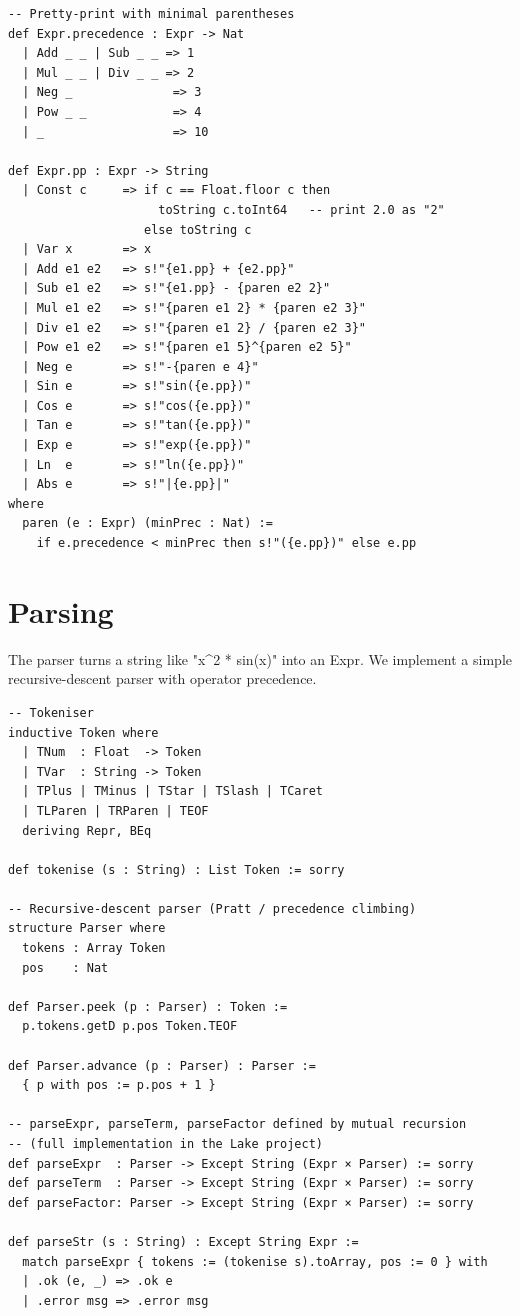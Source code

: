 \documentclass[12pt, openany]{book}
\theoremstyle{plain}
\theoremstyle{definition}
\theoremstyle{remark}
\newcommand{\li}[1]{{\ttfamily\small\color{tealaccent}#1}}
\begin{document}
\begin{leanbox}
\begin{lstlisting}
-- Pretty-print with minimal parentheses
def Expr.precedence : Expr -> Nat
  | Add _ _ | Sub _ _ => 1
  | Mul _ _ | Div _ _ => 2
  | Neg _              => 3
  | Pow _ _            => 4
  | _                  => 10

def Expr.pp : Expr -> String
  | Const c     => if c == Float.floor c then
                     toString c.toInt64   -- print 2.0 as "2"
                   else toString c
  | Var x       => x
  | Add e1 e2   => s!"{e1.pp} + {e2.pp}"
  | Sub e1 e2   => s!"{e1.pp} - {paren e2 2}"
  | Mul e1 e2   => s!"{paren e1 2} * {paren e2 3}"
  | Div e1 e2   => s!"{paren e1 2} / {paren e2 3}"
  | Pow e1 e2   => s!"{paren e1 5}^{paren e2 5}"
  | Neg e       => s!"-{paren e 4}"
  | Sin e       => s!"sin({e.pp})"
  | Cos e       => s!"cos({e.pp})"
  | Tan e       => s!"tan({e.pp})"
  | Exp e       => s!"exp({e.pp})"
  | Ln  e       => s!"ln({e.pp})"
  | Abs e       => s!"|{e.pp}|"
where
  paren (e : Expr) (minPrec : Nat) :=
    if e.precedence < minPrec then s!"({e.pp})" else e.pp
\end{lstlisting}
\end{leanbox}
\color{black}

\section{Parsing}

The parser turns a string like \li{"x\^{}2 * sin(x)"} into an \li{Expr}.
We implement a simple recursive-descent parser with operator precedence.

\begin{leanbox}
\begin{lstlisting}
-- Tokeniser
inductive Token where
  | TNum  : Float  -> Token
  | TVar  : String -> Token
  | TPlus | TMinus | TStar | TSlash | TCaret
  | TLParen | TRParen | TEOF
  deriving Repr, BEq

def tokenise (s : String) : List Token := sorry

-- Recursive-descent parser (Pratt / precedence climbing)
structure Parser where
  tokens : Array Token
  pos    : Nat

def Parser.peek (p : Parser) : Token :=
  p.tokens.getD p.pos Token.TEOF

def Parser.advance (p : Parser) : Parser :=
  { p with pos := p.pos + 1 }

-- parseExpr, parseTerm, parseFactor defined by mutual recursion
-- (full implementation in the Lake project)
def parseExpr  : Parser -> Except String (Expr × Parser) := sorry
def parseTerm  : Parser -> Except String (Expr × Parser) := sorry
def parseFactor: Parser -> Except String (Expr × Parser) := sorry

def parseStr (s : String) : Except String Expr :=
  match parseExpr { tokens := (tokenise s).toArray, pos := 0 } with
  | .ok (e, _) => .ok e
  | .error msg => .error msg
\end{lstlisting}
\end{leanbox}
\color{black}
\end{document}
